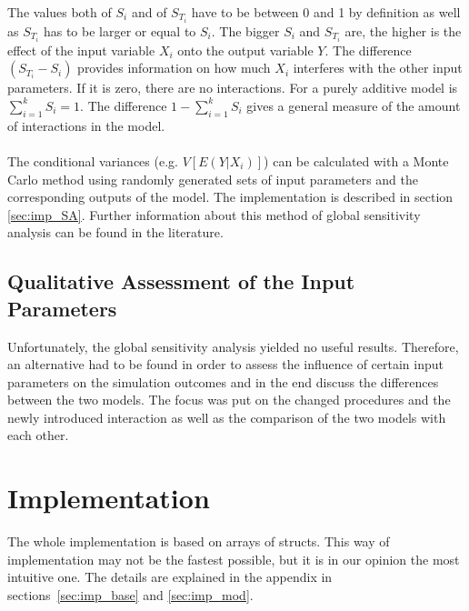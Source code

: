 \documentclass[11pt]{article}
\begin{document}
\\
The values both of $S_i$ and of $S_{T_i}$ have to be between 0 and 1 by definition as well as  $S_{T_i}$ has to be larger or equal to $S_i$. The bigger $S_i$ and $S_{T_i}$ are, the higher is the effect of the input variable $X_i$ onto the output variable $Y$. The difference $(S_{T_i} - S_i)$ provides information on how much $X_i$ interferes with the other input parameters. If it is zero, there are no interactions. For a purely additive model is $\sum_{i=1}^k S_i = 1$. The difference $1 - \sum_{i=1}^k S_i$ gives a general measure of the amount of interactions in the model.\\
\\
The conditional variances (e.g. $V[E(Y|X_i)]$) can be calculated with a Monte Carlo method using randomly generated sets of input parameters and the corresponding outputs of the model. The implementation is described in section \ref{sec:imp_SA}. Further information about this method of global sensitivity analysis can be found in the literature.

\subsection{Qualitative Assessment of the Input Parameters}
Unfortunately, the global sensitivity analysis yielded no useful results. Therefore, an alternative had to be found in order to assess the influence of certain input parameters on the simulation outcomes and in the end discuss the differences between the two models. The focus was put on the changed procedures and the newly introduced interaction as well as the comparison of the two models with each other.

\section{Implementation}
The whole implementation is based on arrays of structs. This way of implementation may not be the fastest possible, but it is in our opinion the most intuitive one. The details are explained in the appendix in sections~\ref{sec:imp_base} and \ref{sec:imp_mod}.
\end{document}
